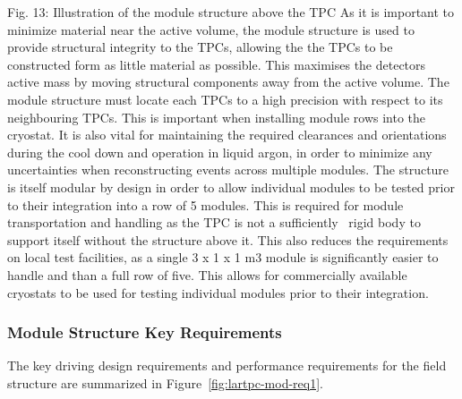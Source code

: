 Fig. 13: Illustration of the module structure above the TPC
As it is important to minimize material near the active volume, the module structure is used to provide structural integrity to the TPCs, allowing the the TPCs to be constructed form as little material as possible. This maximises the detectors active mass by moving structural components away from the active volume.
The module structure must locate each TPCs to a high precision with respect to its neighbouring TPCs. This is important when installing module rows into the cryostat. It is also vital for maintaining the required clearances and orientations during the cool down and operation in liquid argon, in order to minimize any uncertainties when reconstructing events across multiple modules.
The structure is itself modular by design in order to allow individual modules to be tested prior to their integration into a row of 5 modules. This is required for module transportation and handling as the TPC is not a sufficiently  rigid body to support itself without the structure above it. This also reduces the requirements on local test facilities, as a single 3 x 1 x 1 m3 module is significantly easier to handle and than a full row of five. This allows for commercially available cryostats to be used for testing individual modules prior to their integration.
\subsubsection{Module Structure Key Requirements}
\label{sec:lartpc-mod-req} 

The key driving design requirements and performance requirements for the field structure are summarized in Figure~\ref{fig:lartpc-mod-req1}.

